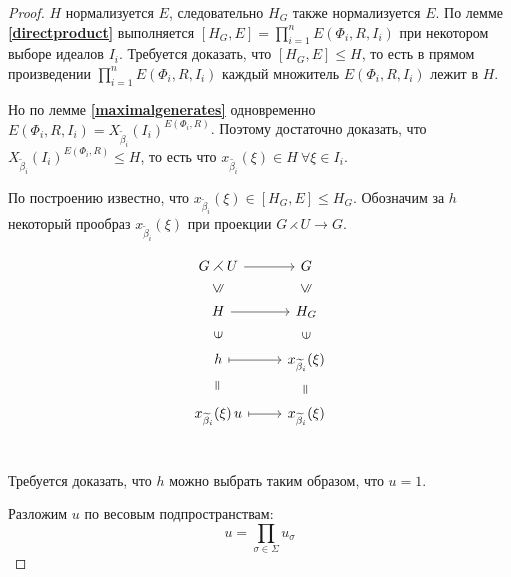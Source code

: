 \documentclass[12pt]{matmex-diploma}
\theoremstyle{mystyleni}
\theoremstyle{mystyle}
\newcommand\refb[1]{\textbf{\ref{#1}}}
\renewcommand{\le}{\leqslant}
\begin{document}
\begin{proof} \quad
$H$ нормализуется $E$, следовательно $H_G$ также нормализуется $E$.
\linebreak
По лемме \refb{directproduct} выполняется $[H_G,E] = \prod_{i=1}^n E(\Phi_i,R,I_i)$ при некотором выборе идеалов $I_i$. Требуется доказать, что $[H_G,E] \le H$, то есть в прямом произведении $\prod_{i=1}^n E(\Phi_i,R,I_i)$ каждый множитель $E(\Phi_i,R,I_i)$  лежит в $H$.

Но по лемме \refb{maximalgenerates} одновременно \vspace{0.8ex} $E(\Phi_i,R,I_i) = X_{\widetilde\beta_i}(I_i)^{E(\Phi_i,R)}$.
Поэтому достаточно доказать, что $X_{\widetilde\beta_i}(I_i)^{E(\Phi_i,R)} \le H$, то есть что
$x_{\widetilde{\beta_i}}(\xi) \in H \ \forall \xi \in I_i$.\vspace{0.8ex}

По построению известно, что $x_{\widetilde\beta_i}(\xi) \in [H_G,E] \le H_G$.
Обозначим за $h$ некоторый прообраз $x_{\widetilde\beta_i}(\xi)$ при проекции $G \rightthreetimes U \rightarrow G$.

\begin{equation*}
\tikzset{
  Subgroup/.style={
    draw=none,
    every to/.append style={
      edge node={node [sloped, allow upside down, auto=false]{$\le$}}}},
  Equals/.style={
    draw=none,
    every to/.append style={
      edge node={node [sloped, allow upside down, auto=false]{$=$}}}},
  Included/.style={
    draw=none,
    every to/.append style={
      edge node={node [sloped, allow upside down, auto=false]{$\in$}}}}
}
\begin{tikzcd}
G \rightthreetimes U \arrow{r}{} & G \\
H \arrow[Subgroup]{u} \arrow{r}{} & H_G \arrow[Subgroup]{u} \\
h \arrow[Included]{u} \arrow[maps to]{r}{} & x_{\widetilde\beta_i}(\xi) \arrow[Included]{u} \\
x_{\widetilde\beta_i}(\xi)\,u \arrow[Equals]{u} \arrow[maps to]{r}{} & x_{\widetilde\beta_i}(\xi) \arrow[Equals]{u} \\
\end{tikzcd}
\end{equation*}


Требуется доказать, что $h$ можно выбрать таким образом, что $u=1$.

\pagebreak

Разложим $u$ по весовым подпространствам:
\begin{equation}\label{weightdecompmain}
u = \prod_{\sigma \in \Sigma} u_\sigma
\end{equation}


\end{proof}
\end{document}
